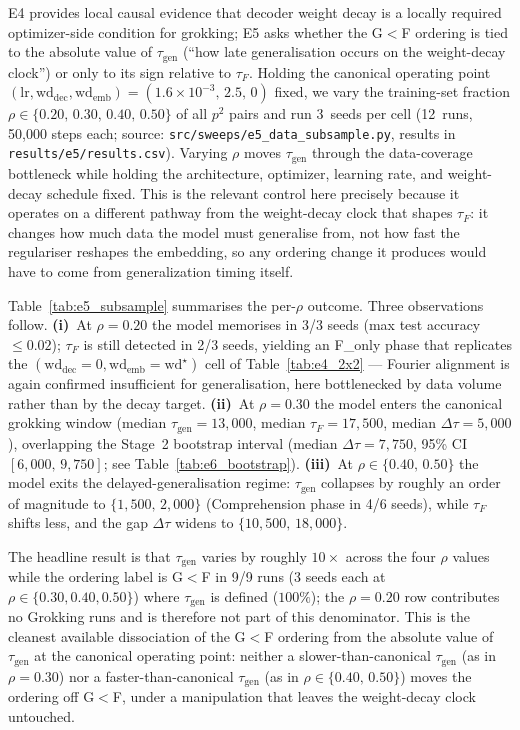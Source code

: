 \documentclass{article}
\newcommand{\taug}{\tau_{\mathrm{gen}}}
\newcommand{\tauf}{\tau_{F}}
\newcommand{\Dtau}{\Delta\tau}
\begin{document}
E4 provides local causal evidence that decoder weight decay is a
locally required optimizer-side condition for grokking; E5 asks
whether the G$<$F ordering is tied to the absolute value
of $\taug$ (``how late generalisation occurs on the weight-decay
clock'') or only to its sign relative to $\tauf$.
Holding the canonical operating point
$(\mathrm{lr},\mathrm{wd}_{\mathrm{dec}},\mathrm{wd}_{\mathrm{emb}}){=}
(1.6{\times}10^{-3},\,2.5,\,0)$ fixed, we vary the training-set
fraction $\rho\in\{0.20,\,0.30,\,0.40,\,0.50\}$ of all $p^{2}$
pairs and run 3~seeds per cell (12~runs, 50{,}000 steps each;
source: \texttt{src/sweeps/e5\_data\_subsample.py},
results in \texttt{results/e5/results.csv}).
Varying $\rho$ moves $\taug$ through the data-coverage bottleneck
while holding the architecture, optimizer, learning rate, and
weight-decay schedule fixed.
This is the relevant control here precisely because it operates on
a different pathway from the weight-decay clock that shapes
$\tauf$: it changes how much data the model must generalise from,
not how fast the regulariser reshapes the embedding, so any
ordering change it produces would have to come from
generalization timing itself.

Table~\ref{tab:e5_subsample} summarises the per-$\rho$ outcome.
Three observations follow.
\textbf{(i)}~At $\rho{=}0.20$ the model memorises in 3/3 seeds
(max test accuracy $\leq 0.02$); $\tauf$ is still detected in
2/3 seeds, yielding an F\_only phase that replicates the
$(\mathrm{wd}_{\mathrm{dec}}{=}0,\mathrm{wd}_{\mathrm{emb}}{=}\mathrm{wd}^{\star})$
cell of Table~\ref{tab:e4_2x2} --- Fourier alignment is
again confirmed insufficient for generalisation, here
bottlenecked by data volume rather than by the decay target.
\textbf{(ii)}~At $\rho{=}0.30$ the model enters the canonical
grokking window (median $\taug{=}13{,}000$, median $\tauf{=}17{,}500$,
median $\Dtau{=}5{,}000$), overlapping the Stage~2 bootstrap
interval (median $\Dtau{=}7{,}750$, 95\% CI $[6{,}000,\,9{,}750]$;
see Table~\ref{tab:e6_bootstrap}).
\textbf{(iii)}~At $\rho\in\{0.40,\,0.50\}$ the model exits the
delayed-generalisation regime: $\taug$ collapses by roughly an
order of magnitude to $\{1{,}500,\,2{,}000\}$ (Comprehension
phase in 4/6 seeds), while $\tauf$ shifts less, and the gap
$\Dtau$ widens to $\{10{,}500,\,18{,}000\}$.

The headline result is that $\taug$ varies by roughly $10\times$
across the four $\rho$ values while the ordering label is G$<$F
in 9/9 runs (3 seeds each at $\rho\in\{0.30, 0.40, 0.50\}$) where
$\taug$ is defined ($100\%$); the $\rho{=}0.20$ row contributes
no Grokking runs and is therefore not part of this denominator.
This is the cleanest available dissociation of the G$<$F ordering
from the absolute value of $\taug$ at the canonical operating
point: neither a slower-than-canonical $\taug$ (as in
$\rho{=}0.30$) nor a faster-than-canonical $\taug$ (as in
$\rho\in\{0.40,\,0.50\}$) moves the ordering off G$<$F, under a
manipulation that leaves the weight-decay clock untouched.
\end{document}
